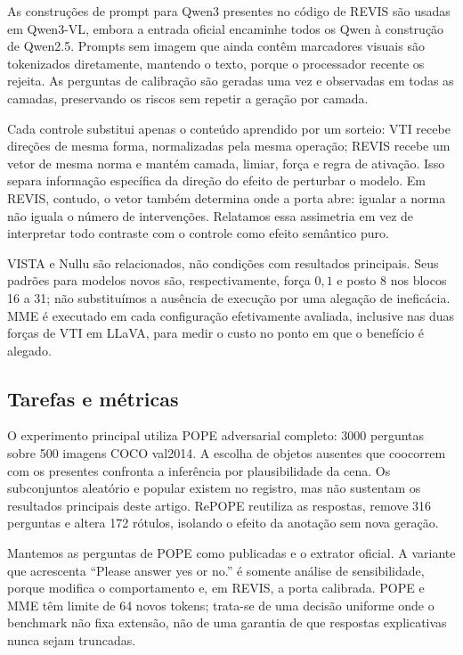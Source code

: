 As construções de prompt para Qwen3 presentes no código de REVIS são usadas em Qwen3-VL, embora a entrada oficial encaminhe todos os Qwen à construção de Qwen2.5. Prompts sem imagem que ainda contêm marcadores visuais são tokenizados diretamente, mantendo o texto, porque o processador recente os rejeita. As perguntas de calibração são geradas uma vez e observadas em todas as camadas, preservando os riscos sem repetir a geração por camada.

Cada controle substitui apenas o conteúdo aprendido por um sorteio: VTI recebe direções de mesma forma, normalizadas pela mesma operação; REVIS recebe um vetor de mesma norma e mantém camada, limiar, força e regra de ativação. Isso separa informação específica da direção do efeito de perturbar o modelo. Em REVIS, contudo, o vetor também determina onde a porta abre: igualar a norma não iguala o número de intervenções. Relatamos essa assimetria em vez de interpretar todo contraste com o controle como efeito semântico puro.

VISTA e Nullu são relacionados, não condições com resultados principais. Seus padrões para modelos novos são, respectivamente, força $0{,}1$ e posto 8 nos blocos 16 a 31; não substituímos a ausência de execução por uma alegação de ineficácia. MME é executado em cada configuração efetivamente avaliada, inclusive nas duas forças de VTI em LLaVA, para medir o custo no ponto em que o benefício é alegado.

\subsection{Tarefas e métricas}
O experimento principal utiliza POPE adversarial completo: 3000 perguntas sobre 500 imagens COCO val2014. A escolha de objetos ausentes que coocorrem com os presentes confronta a inferência por plausibilidade da cena. Os subconjuntos aleatório e popular existem no registro, mas não sustentam os resultados principais deste artigo. RePOPE reutiliza as respostas, remove 316 perguntas e altera 172 rótulos, isolando o efeito da anotação sem nova geração.

Mantemos as perguntas de POPE como publicadas e o extrator oficial. A variante que acrescenta ``Please answer yes or no.'' é somente análise de sensibilidade, porque modifica o comportamento e, em REVIS, a porta calibrada. POPE e MME têm limite de 64 novos tokens; trata-se de uma decisão uniforme onde o benchmark não fixa extensão, não de uma garantia de que respostas explicativas nunca sejam truncadas.

